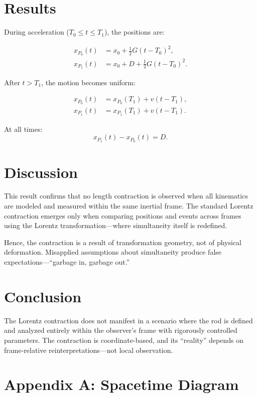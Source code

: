 \documentclass[11pt]{article}
\begin{document}
\section{Results}

During acceleration ($T_0 \le t \le T_1$), the positions are:

\begin{align*}
    x_{P_0}(t) &= x_0 + \frac{1}{2}G(t - T_0)^2, \\
    x_{P_1}(t) &= x_0 + D + \frac{1}{2}G(t - T_0)^2.
\end{align*}

After $t > T_1$, the motion becomes uniform:

\begin{align*}
    x_{P_0}(t) &= x_{P_0}(T_1) + v(t - T_1), \\
    x_{P_1}(t) &= x_{P_1}(T_1) + v(t - T_1).
\end{align*}

At all times:
\[
x_{P_1}(t) - x_{P_0}(t) = D.
\]

\section{Discussion}

This result confirms that no length contraction is observed when all kinematics are modeled and measured within the same inertial frame. The standard Lorentz contraction emerges only when comparing positions and events across frames using the Lorentz transformation—where simultaneity itself is redefined.

Hence, the contraction is a result of transformation geometry, not of physical deformation. Misapplied assumptions about simultaneity produce false expectations—“garbage in, garbage out.”

\section{Conclusion}

The Lorentz contraction does not manifest in a scenario where the rod is defined and analyzed entirely within the observer’s frame with rigorously controlled parameters. The contraction is coordinate-based, and its “reality” depends on frame-relative reinterpretations—not local observation.

\newpage
\appendix
\section*{Appendix A: Spacetime Diagram}
\end{document}
